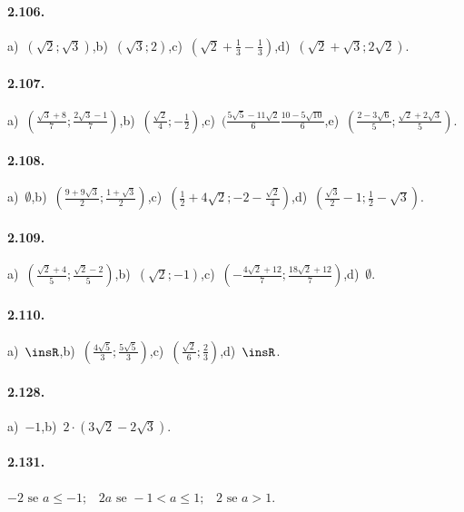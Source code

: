 \paragraph{2.106.}
a)~$(\sqrt 2;\sqrt 3)$,\quad b)~$(\sqrt 3;2)$,\quad c)~$(\sqrt 2+\frac 1 3-\frac 1 3)$,\quad d)~$(\sqrt 2+\sqrt 3;2\sqrt 2)$.

\paragraph{2.107.}
a)~$(\frac{\sqrt 3+8} 7;\frac{2\sqrt 3-1} 7)$,\quad b)~$(\frac{\sqrt 2} 4;-\frac 1 2)$,\quad c)~$(\frac{5\sqrt 5-11\sqrt 2} 6\frac{10-5\sqrt{10}} 6$,\quad e)~$(\frac{2-3\sqrt 6} 5; \frac{\sqrt 2+2\sqrt 3} 5)$.

\paragraph{2.108.}
a)~$\emptyset$,\quad b)~$(\frac{9+9\sqrt 3} 2;\frac{1+\sqrt 3} 2)$,\quad c)~$(\frac 1 2+4\sqrt 2;-2-\frac{\sqrt 2} 4)$,\quad d)~$(\frac{\sqrt 3} 2-1;\frac 1 2-\sqrt 3)$.

\paragraph{2.109.}
a)~$(\frac{\sqrt 2+4} 5;\frac{\sqrt 2-2} 5)$,\quad b)~$(\sqrt 2;-1)$,\quad c)~$(-\frac{4\sqrt 2+12} 7;\frac{18\sqrt 2+12} 7)$,\quad d)~$\emptyset$.

\paragraph{2.110.}
a)~$\insR$,\quad b)~$(\frac{4\sqrt 5} 3;\frac{5\sqrt 5} 3)$,\quad c)~$(\frac{\sqrt 2} 6;\frac 2 3)$,\quad d)~$\insR$.
\paragraph{2.128.}
a)~$-1$,\quad b)~$2\cdot (3\sqrt 2-2\sqrt 3)$.
\paragraph{2.131.}
$-2 \text{ se }a\le -1\text{;}\quad 2a \text{ se }-1<a\le 1\text{;}\quad 2 \text{ se }a>1$.
